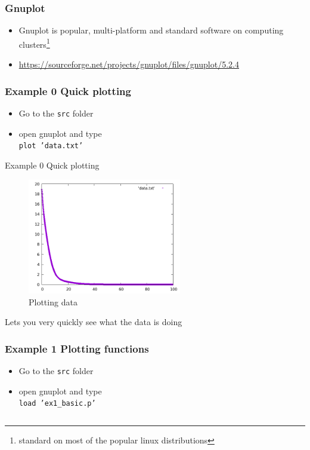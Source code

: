 \documentclass{beamer}
\begin{document}
\begin{frame}
\frametitle{Gnuplot} 
\begin{itemize}
	\item Gnuplot is popular, multi-platform and standard software on computing clusters\footnote{standard on most of the popular linux distributions} 
    \item \url{https://sourceforge.net/projects/gnuplot/files/gnuplot/5.2.4}
\end{itemize}
\end{frame}

\begin{frame}[fragile]
    \frametitle{Example 0 Quick plotting}
\begin{itemize}
	\item Go to the \texttt{src} folder
    \item open gnuplot and type \\ \texttt{plot 'data.txt'}
\end{itemize}
\end{frame}

\begin{frame}{Example 0 Quick plotting}
    \begin{figure}
	\centering
	\includegraphics[width=0.6\textwidth]{src/data.png}
	\caption{Plotting data}
	\label{fig:function}
\end{figure}
Lets you very quickly see what the data is doing
\end{frame}

\begin{frame}[fragile]
    \frametitle{Example 1 Plotting functions}
\begin{itemize}
	\item Go to the \texttt{src} folder
    \item open gnuplot and type \\ \texttt{load 'ex1\_basic.p'}
\end{itemize}
\inputminted[fontsize=\small]{bash}{src/ex1_basic.p}
\end{frame}
\end{document}
